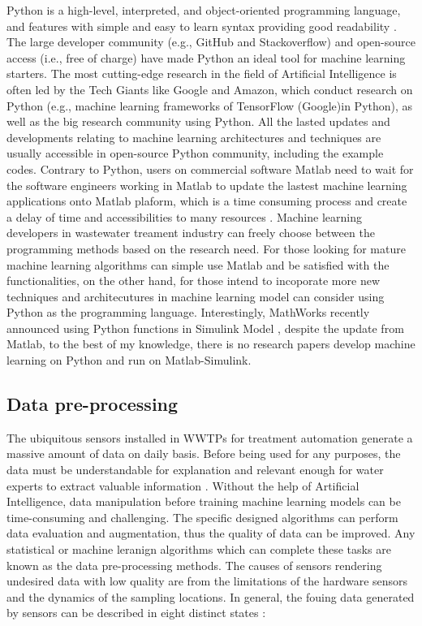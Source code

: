 Python is a high-level, interpreted, and object-oriented programming language, and features with simple and easy to learn syntax providing good readability \citep{WhatPythonExecutive}. The large developer community (e.g., GitHub and Stackoverflow) and open-source access (i.e., free of charge) have made Python an ideal tool for machine learning starters. The most cutting-edge research in the field of Artificial Intelligence is often led by the Tech Giants like Google and Amazon, which conduct research on Python (e.g., machine learning frameworks of TensorFlow (Google)in Python), as well as the big research community using Python. All the lasted updates and developments relating to machine learning architectures and techniques are usually accessible in open-source Python community, including the example codes. Contrary to Python, users on commercial software Matlab need to wait for the software engineers working in Matlab to update the lastest machine learning applications onto Matlab plaform, which is a time consuming process and create a delay of time and accessibilities to many resources \citep{castroWhyShouldChoose2018}. Machine learning developers in wastewater treament industry can freely choose between the programming methods based on the research need. For those looking for mature machine learning algorithms can simple use Matlab and be satisfied with the functionalities, on the other hand, for those intend to incoporate more new techniques and architecutures in machine learning model can consider using Python as the programming language. Interestingly, MathWorks recently announced using Python functions in Simulink Model \citep{mathworksCallPythonFunction2022}, despite the update from Matlab, to the best of my knowledge, there is no research papers develop machine learning on Python and run on Matlab-Simulink. 

\subsection{Data pre-processing}
The ubiquitous sensors installed in WWTPs for treatment automation generate a massive amount of data on daily basis. Before being used for any purposes, the data must be understandable for explanation and relevant enough for water experts to extract valuable information \citep{kehreinCriticalReviewResource2020}. Without the help of Artificial Intelligence, data manipulation before training machine learning models can be time-consuming and challenging. The specific designed algorithms can perform data evaluation and augmentation, thus the quality of data can be improved. Any statistical or machine leranign algorithms which can complete these tasks are known as the data pre-processing methods. The causes of sensors rendering undesired data with low quality are from the limitations of the hardware sensors and the dynamics of the sampling locations. In general, the fouing data generated by sensors can be described in eight distinct states \citep{rosenAddingRealismSimulated2008,newhartDatadrivenPerformanceAnalyses2019}:


